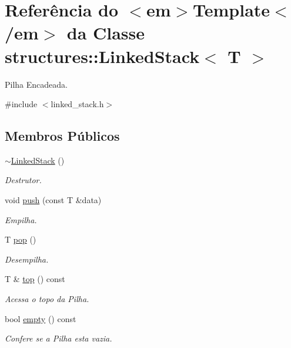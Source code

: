 \hypertarget{classstructures_1_1_linked_stack}{}\section{Referência do $<$em$>$Template$<$/em$>$ da Classe structures\+::Linked\+Stack$<$ T $>$}
\label{classstructures_1_1_linked_stack}


Pilha Encadeada.  




{\ttfamily \#include $<$linked\+\_\+stack.\+h$>$}

\subsection*{Membros Públicos}
\begin{DoxyCompactItemize}
\item 
\mbox{\hyperlink{classstructures_1_1_linked_stack_ab2fdb20d8918bf824e50a9038acef636}{$\sim$\+Linked\+Stack}} ()
\begin{DoxyCompactList}\small\item\em Destrutor. \end{DoxyCompactList}\item 
void \mbox{\hyperlink{classstructures_1_1_linked_stack_a1af82de27376dbfb49c2872fef6cbcab}{push}} (const T \&data)
\begin{DoxyCompactList}\small\item\em Empilha. \end{DoxyCompactList}\item 
T \mbox{\hyperlink{classstructures_1_1_linked_stack_af831820610fd8e0a145757813a9afb4b}{pop}} ()
\begin{DoxyCompactList}\small\item\em Desempilha. \end{DoxyCompactList}\item 
T \& \mbox{\hyperlink{classstructures_1_1_linked_stack_ac1405eff07488586dced5275b97e562f}{top}} () const
\begin{DoxyCompactList}\small\item\em Acessa o topo da Pilha. \end{DoxyCompactList}\item 
bool \mbox{\hyperlink{classstructures_1_1_linked_stack_a42b81c0a1c2e0ab6ef2e0fe04a584001}{empty}} () const
\begin{DoxyCompactList}\small\item\em Confere se a Pilha esta vazia. \end{DoxyCompactList}\item 

\end{DoxyCompactItemize}
